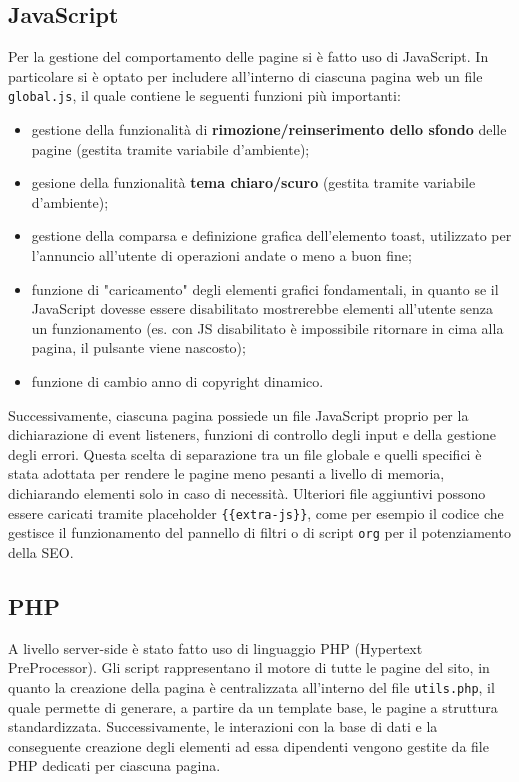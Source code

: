 \documentclass[a4paper,10pt]{article}
\begin{document}
	\subsection{JavaScript}
	Per la gestione del comportamento delle pagine si è fatto uso di JavaScript. In particolare si è optato per includere all'interno di ciascuna pagina web un file \texttt{global.js}, il quale contiene le seguenti funzioni più importanti:
	\begin{itemize}
		\item gestione della funzionalità di \textbf{rimozione/reinserimento dello sfondo} delle pagine (gestita tramite variabile d'ambiente);
		\item gesione della funzionalità \textbf{tema chiaro/scuro} (gestita tramite variabile d'ambiente);
		\item gestione della comparsa e definizione grafica dell'elemento toast, utilizzato per l'annuncio all'utente di operazioni andate o meno a buon fine;
		\item funzione di "caricamento" degli elementi grafici fondamentali, in quanto se il JavaScript dovesse essere disabilitato mostrerebbe elementi all'utente senza un funzionamento (es. con JS disabilitato è impossibile ritornare in cima alla pagina, il pulsante viene nascosto);
		\item funzione di cambio anno di copyright dinamico.
	\end{itemize}
	Successivamente, ciascuna pagina possiede un file JavaScript proprio per la dichiarazione di event listeners, funzioni di controllo degli input e della gestione degli errori. Questa scelta di separazione tra un file globale e quelli specifici è stata adottata per rendere le pagine meno pesanti a livello di memoria, dichiarando elementi solo in caso di necessità.
	Ulteriori file aggiuntivi possono essere caricati tramite placeholder \texttt{\{\{extra-js\}\}}, come per esempio il codice che gestisce il funzionamento del pannello di filtri o di script \texttt{org} per il potenziamento della SEO.
	\subsection{PHP}
	A livello server-side è stato fatto uso di linguaggio PHP (Hypertext PreProcessor). Gli script rappresentano il motore di tutte le pagine del sito, in quanto la creazione della pagina è centralizzata all'interno del file \texttt{utils.php}, il quale permette di generare, a partire da un template base, le pagine a struttura standardizzata. Successivamente, le interazioni con la base di dati e la conseguente creazione degli elementi ad essa dipendenti vengono gestite da file PHP dedicati per ciascuna pagina.
\end{document}
